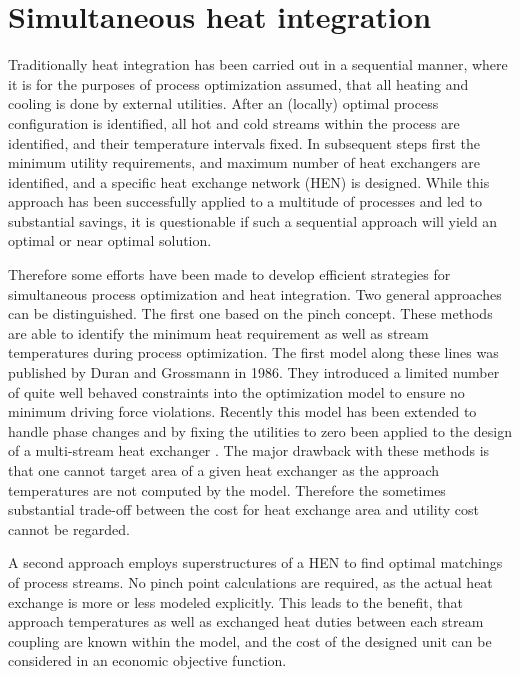 \chapter{Simultaneous heat integration}
\label{app:heat}

    Traditionally heat integration has been carried out in a sequential manner, where it is for the purposes of process
    optimization assumed, that all heating and cooling is done by external utilities. After an (locally) optimal
    process configuration is identified, all hot and cold streams within the process are identified, and their
    temperature intervals fixed. %
    In subsequent steps first the minimum utility requirements, and maximum number of heat exchangers are identified,
    and a specific heat exchange network (HEN) is designed.
    While this approach has been successfully applied to a multitude of processes and led to substantial savings,
    it is questionable if such a sequential approach will yield an optimal or near optimal solution.

    Therefore some efforts have been made to develop efficient strategies for simultaneous process optimization
    and heat integration. Two general approaches can be distinguished. The first one based on the pinch concept.
     These methods are able to identify the minimum heat requirement
    as well as stream temperatures during process optimization. The first model along these lines was published
    by Duran and Grossmann \cite{Duran.1986} in 1986. They introduced a limited number of quite well behaved
    constraints into the optimization model to ensure no minimum driving force violations. Recently
    this model has been extended to handle phase changes and by fixing the utilities to zero been applied
    to the design of a multi-stream heat exchanger \cite{Kamath.2012}. The major drawback with these methods
    is that one cannot target area of a given heat exchanger as the approach temperatures are not computed
    by the model. Therefore the sometimes substantial trade-off between the cost for heat exchange area
    and utility cost cannot be regarded.

    A second approach employs superstructures of a HEN to find optimal matchings of process streams. No pinch
    point calculations are required, as the actual heat exchange is more or less modeled explicitly. This
    leads to the benefit, that approach temperatures as well as exchanged heat duties between each stream coupling
    are known within the model, and the cost of the designed unit can be considered in an economic objective
    function.

